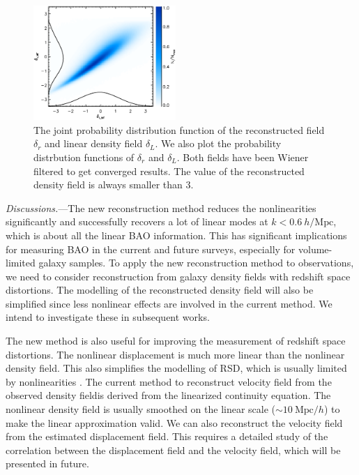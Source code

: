 \documentclass[aps,prd,twocolumn,superscriptaddress,groupedaddress,nofootinbib]{revtex4}  %
\newcommand{\mr}{\mathrm}
\begin{document}
\begin{figure}[tbp]
\begin{center}
\includegraphics[width=0.48\textwidth]{pdfwf-b.eps}
\end{center}
\vspace{-0.7cm}
\caption{The joint probability distribution function of the reconstructed field 
    $\delta_r$ and linear density field $\delta_L$. We also plot the 
probability distrbution functions of $\delta_r$ and $\delta_L$. Both fields
have been Wiener filtered to get converged results. The value of the 
reconstructed density field is always smaller than 3.}
\label{fig:pdf}
\end{figure}

{\it Discussions.}---The new reconstruction method reduces the nonlinearities 
significantly and successfully recovers a lot of linear modes 
at $k<0.6\ h/\mr{Mpc}$, which is about all the linear BAO information.
This has significant implications for measuring BAO in the current and future 
surveys, especially for volume-limited galaxy samples. 
To apply the new reconstruction method to observations, we need to consider 
reconstruction from galaxy density fields with redshift space distortions.
The modelling of the reconstructed density field will also be simplified since
less nonlinear effects are involved in the current method.
We intend to investigate these in subsequent works. 

The new method is also useful for improving the measurement of redshift space
distortions. The nonlinear displacement is much more linear than
the nonlinear density field. 
This also simplifies the modelling of RSD, which is usually
limited by nonlinearities \cite{2013PhRvD..87f3526Z}.
The current method to reconstruct velocity field from the observed density 
fieldis derived from the linearized continuity equation. 
The nonlinear density field is usually smoothed on the linear scale
($\sim10\ \mr{Mpc}/h$) to make the linear approximation valid.
We can also reconstruct the velocity field from the estimated displacement 
field.
This requires a detailed study of the correlation between the displacement 
field and the velocity field, which will be presented in future.
\end{document}
